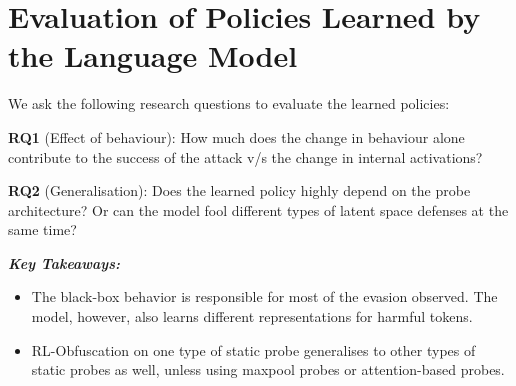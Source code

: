 \vspace{-12pt}
\section{Evaluation of Policies Learned by the Language Model}
\label{sec:eval_policy}
We ask the following research questions to evaluate the learned policies:


\textbf{RQ1} (Effect of behaviour): How much does the change in behaviour alone contribute to the success of the attack v/s the change in internal activations? 

\textbf{RQ2} (Generalisation): Does the learned policy highly depend on the probe architecture? Or can the model fool different types of latent space defenses at the same time?

\begin{result}
{
\textbf{   \em Key Takeaways:}
}
\begin{itemize}
    \item The black-box behavior is responsible for most of the evasion observed. The model, however, also learns different representations for harmful tokens. 
    \item RL-Obfuscation on one type of static probe generalises to other types of static probes as well, unless using maxpool probes or attention-based probes. 
\end{itemize}
\end{result}
